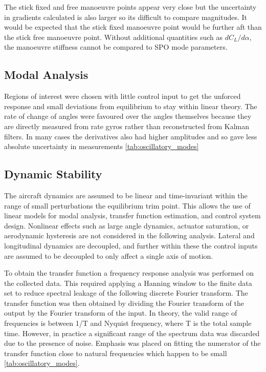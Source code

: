 \documentclass{article}
\begin{document}
The stick fixed and free manoeuvre points appear very close but the uncertainty in gradients calculated is also larger so its difficult to compare magnitudes.
It would be expected that the stick fixed manoeuvre point would be further aft than the stick free manoeuvre point.
Without additional quantities such as $dC_L/d\alpha$, the manoeuvre stiffness cannot be compared to SPO mode parameters.

\subsection{Modal Analysis}

Regions of interest were chosen with little control input to get the unforced response and small deviations
from equilibrium to stay within linear theory. The rate of change of angles were favoured over the angles
themselves because they are directly measured from rate gyros rather than reconstructed from Kalman
filters. In many cases the derivatives also had higher amplitudes and so gave less absolute uncertainty in
measurements \ref{tab:oscillatory_modes}


\subsection{Dynamic Stability}

The aircraft dynamics are assumed to be linear and time-invariant within the range of small perturbations the equilibrium trim point.
This allows the use of linear models for modal analysis, transfer function estimation, and control system design.
Nonlinear effects such as large angle dynamics, actuator saturation, or aerodynamic hysteresis are not considered in the following analysis.
Lateral and longitudinal dynamics are decoupled, and further within these the control inputs are assumed to be decoupled to only affect a single axis of motion.

To obtain the transfer function a frequency response analysis was performed on the collected data.
This required applying a Hanning window to the finite data set to reduce spectral leakage of the following discrete Fourier transform.
The transfer function was then obtained by dividing the Fourier transform of the output by the Fourier transform of the input.
In theory, the valid range of frequencies is between 1/T and Nyquist frequency, where T is the total sample time.
However, in practice a significant range of the spectrum data was discarded due to the presence of noise.
Emphasis was placed on fitting the numerator of the transfer function close to natural frequencies which happen to be small \ref{tab:oscillatory_modes}.
\end{document}
